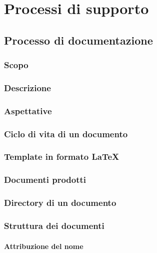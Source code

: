 \section{Processi di supporto}


\subsection{Processo di documentazione}

\subsubsection{Scopo}

\subsubsection{Descrizione}

\subsubsection{Aspettative}

\subsubsection{Ciclo di vita di un documento}

\subsubsection{Template in formato \LaTeX}

\subsubsection{Documenti prodotti}

\subsubsection{Directory di un documento}

\subsubsection{Struttura dei documenti}

\paragraph{Attribuzione del nome}

